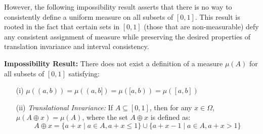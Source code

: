 However, the following impossibility result asserts that there is no way to consistently define a uniform measure on all subsets of $[0, 1]$. This result is rooted in the fact that certain sets in $[0, 1]$ (those that are non-measurable) defy any consistent assignment of measure while preserving the desired properties of translation invariance and interval consistency.

\begin{theorem}
    \textbf{Impossibility Result:} There does not exist a definition of a measure $\mu(A)$ for all subsets of $[0, 1]$ satisfying:

    \begin{itemize}
        \item[(i)] $\mu((a, b)) = \mu((a, b]) = \mu([a, b)) = \mu([a, b])$
        \item[(ii)] \textit{Translational Invariance:} If $A \subseteq [0, 1]$, then for any $x \in \Omega$, $\mu(A \oplus x) = \mu(A)$, where the set $A \oplus x$ is defined as:
        \[
        A \oplus x = \{a + x \mid a \in A, a + x \leq 1\} \cup \{a + x - 1 \mid a \in A, a + x > 1\}
        \]
    \end{itemize}
\end{theorem}

